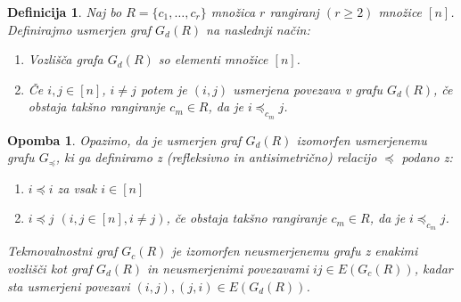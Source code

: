 \documentclass[a4paper, 12pt]{book}
\newtheorem{definicija}{Definicija}[chapter]
\newtheorem{opomba}{Opomba}[chapter]
\begin{document}

\begin{definicija}
\label{definicija_gdr}
    Naj bo $R = \{ c_1, \dots, c_r \}$ množica $r$ rangiranj $(r \geq 2)$ množice $[n]$. Definirajmo usmerjen graf $G_d(R)$  na naslednji način:
    \begin{enumerate}[label=(\roman*)]
        \item Vozlišča grafa $G_d(R)$ so elementi množice $[n]$.
        \item Če $i, j \in [n]$, $i \neq j$ potem je $(i, j)$ usmerjena povezava v grafu $G_d(R)$, če obstaja takšno rangiranje $c_m \in R$, da je $i \preceq_{c_m} j$.
    \end{enumerate}
\end{definicija}

\begin{opomba}
    Opazimo, da je usmerjen graf $G_d(R)$ izomorfen usmerjenemu grafu $G_{\preceq}$, ki ga definiramo z (refleksivno in antisimetrično) relacijo $\preceq$ podano z:
    \begin{enumerate}[label=(\roman*)]
        \item $i \preceq i$ za vsak $i \in [n]$
        \item $i \preceq j$ $(i,j \in [n], i \neq j)$, če obstaja takšno rangiranje $c_m \in R$, da je $i \preceq_{c_m} j$.
    \end{enumerate}
    Tekmovalnostni graf $G_c(R)$ je izomorfen neusmerjenemu grafu z enakimi vozlišči kot graf $G_d(R)$ in neusmerjenimi povezavami $ij \in E(G_c(R))$, kadar sta usmerjeni povezavi $(i, j), (j, i) \in E(G_d(R))$.
\end{opomba}
\end{document}
